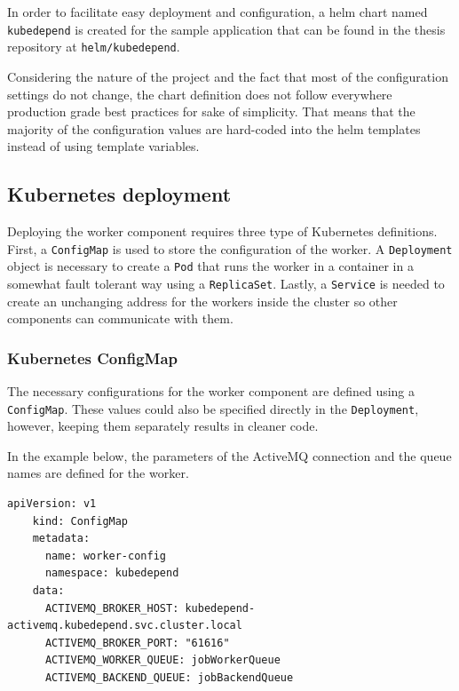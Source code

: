 In order to facilitate easy deployment and configuration, a helm chart named \texttt{kubedepend} is created for the sample application that can be found in the thesis repository \cite{ThesisRepo} at \texttt{helm/kubedepend}.

Considering the nature of the project and the fact that most of the configuration settings do not change, the chart definition does not follow everywhere production grade best practices for sake of simplicity. That means that the majority of the configuration values are hard-coded into the helm templates instead of using template variables.

\subsection{Kubernetes deployment}

Deploying the worker component requires three type of Kubernetes definitions. First, a \texttt{ConfigMap} is used to store the configuration of the worker. A \texttt{Deployment} object is necessary to create a \texttt{Pod} that runs the worker in a container in a somewhat fault tolerant way using a \texttt{ReplicaSet}. Lastly, a \texttt{Service} is needed to create an unchanging address for the workers inside the cluster so other components can communicate with them.

\subsubsection{Kubernetes ConfigMap}

The necessary configurations for the worker component are defined using a \texttt{ConfigMap}. These values could also be specified directly in the \texttt{Deployment}, however, keeping them separately results in cleaner code.

In the example below, the parameters of the ActiveMQ connection and the queue names are defined for the worker.

\vspace{0.5cm}
\begin{minipage}{\linewidth}
	\begin{lstlisting}[caption={Worker \texttt{ConfigMap}}]
	apiVersion: v1
	kind: ConfigMap
	metadata:
	  name: worker-config
	  namespace: kubedepend
	data:
	  ACTIVEMQ_BROKER_HOST: kubedepend-activemq.kubedepend.svc.cluster.local
	  ACTIVEMQ_BROKER_PORT: "61616"
	  ACTIVEMQ_WORKER_QUEUE: jobWorkerQueue
	  ACTIVEMQ_BACKEND_QUEUE: jobBackendQueue\end{lstlisting}
\end{minipage}


